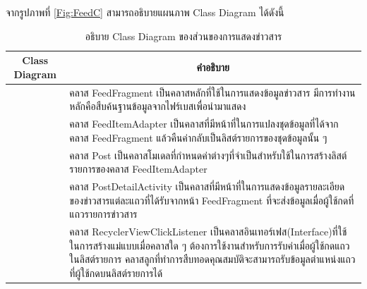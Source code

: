 \newpage
จากรูปภาพที่ \ref{Fig:FeedC} สามารถอธิบายแผนภาพ Class Diagram ได้ดังนี้
\begin{table}[H]
	\centering
	\caption{อธิบาย Class Diagram ของส่วนของการแสดงข่าวสาร}
	\label{tab:class}
	\begin{tabular}{|c|p{10cm}|}
		\hline
		\textbf{Class Diagram} & \multicolumn{1}{c|}{\textbf{คำอธิบาย}} \\ \hline
		\raisebox{-\totalheight}{FeedFragment}
		& \setstretch{1.5} {คลาส FeedFragment เป็นคลาสหลักที่ใช้ในการแสดงข้อมูลข่าวสาร มีการทำงานหลักคือสืบค้นฐานข้อมูลจากไฟร์เบสเพื่อนำมาแสดง} \\ \hline
		\raisebox{-\totalheight}{FeedItemAdapter}
		& \setstretch{1.5} {คลาส FeedItemAdapter เป็นคลาสที่มีหน้าที่ในการแปลงชุดข้อมูลที่ได้จากคลาส FeedFragment แล้วคืนค่ากลับเป็นลิสต์รายการของชุดข้อมูลนั้น ๆ} \\ \hline
		\raisebox{-\totalheight}{Post}
		& \setstretch{1.5} {คลาส Post เป็นคลาสโมเดลที่กำหนดค่าต่างๆที่จำเป็นสำหรับใช้ในการสร้างลิสต์รายการของคลาส FeedItemAdapter} \\ \hline
		\raisebox{-\totalheight}{PostDetailActivity}
		& \setstretch{1.5} {คลาส PostDetailActivity เป็นคลาสที่มีหน้าที่ในการแสดงข้อมูลรายละเอียดของข่าวสารแต่ละแถวที่ได้รับจากหน้า FeedFragment ที่จะส่งข้อมูลเมื่อผู้ใช้กดที่แถวรายการข่าวสาร} \\ \hline
		\raisebox{-\totalheight}{RecyclerViewClickListener}
		& \setstretch{1.5} {คลาส RecyclerViewClickListener เป็นคลาสอินเทอร์เฟส(Interface)ที่ใช้ในการสร้างแม่แบบเมื่อคลาสใด ๆ ต้องการใช้งานสำหรับการรับค่าเมื่อผู้ใช้กดแถวในลิสต์รายการ คลาสลูกที่ทำการสืบทอดคุณสมบัติจะสามารถรับข้อมูลตำแหน่งแถวที่ผู้ใช้กดบนลิสต์รายการได้} \\ \hline
	\end{tabular}
\end{table}

